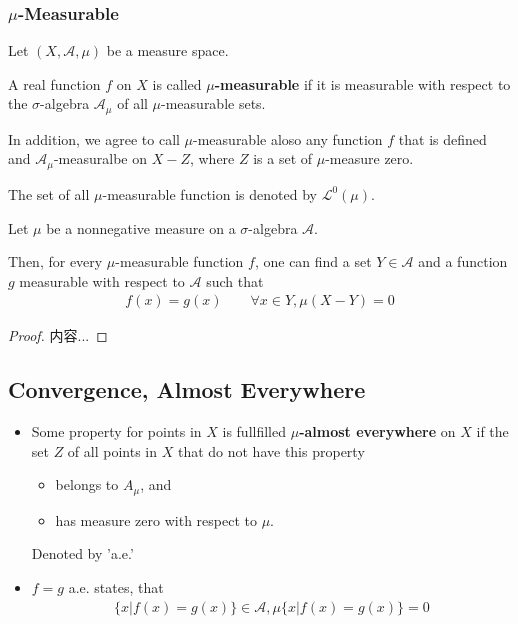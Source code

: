 \documentclass[Total.tex]{subfiles}
\begin{document}
			\subsubsection{$\mu$-Measurable}
			
			\begin{Def}
				Let $(X,\mathcal{A},\mu)$ be a measure space. 
				
				A real function $f$ on $X$ is called \textbf{$\mu$-measurable} if it is measurable with respect to the $\sigma$-algebra $\mathcal{A}_\mu$ of all $\mu$-measurable sets.
				
				In addition, we agree to call $\mu$-measurable aloso any function $f$ that is defined and $\mathcal{A}_\mu$-measuralbe on $X-Z$, where $Z$ is a set of $\mu$-measure zero. 
				
				The set of all $\mu$-measurable function is denoted by $\mathcal{L}^0(\mu)$. 
			\end{Def}
			
			\begin{proposition}
				Let $\mu$ be a nonnegative measure on a $\sigma$-algebra $\mathcal{A}$. 
				
				Then, for every $\mu$-measurable function $f$, one can find a set $Y\in \mathcal{A}$ and a function $g$ measurable with respect to $\mathcal{A}$ such that
				\begin{gather*}
					f(x)=g(x)\qquad \forall x\in Y,\mu(X-Y)=0
				\end{gather*}
			\end{proposition}
			\begin{proof}
				内容...
			\end{proof}
			
			
			\subsection{Convergence, Almost Everywhere }
			
			\begin{Def}
				\begin{itemize}
					\item Some property for points in $X$ is fullfilled \textbf{$\mu
					$-almost everywhere} on $X$ if the set $Z$ of all points in $X$ that do not have this property 
					\begin{itemize}
						\item belongs to $A_\mu$, and
						\item has measure zero with respect to $\mu$. 
					\end{itemize}
					
					Denoted by 'a.e.'
					\item $f=g$ a.e. states, that
					\begin{gather*}
						\{x|f(x)=g(x)\}\in \mathcal{A},\mu\{x|f(x)=g(x)\}=0
					\end{gather*}
				\end{itemize}
			\end{Def}
			
\end{document}
